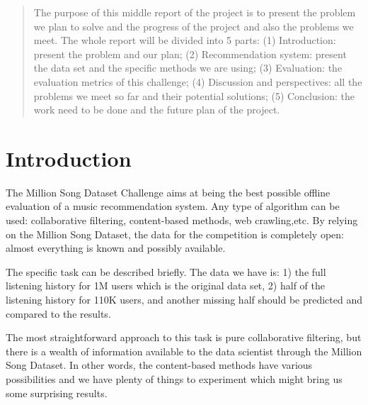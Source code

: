 \documentclass{article}
\begin{document}
 

\begin{abstract} 
The purpose of this middle report of the project is to present the problem we plan to solve and the progress of the project and also the problems we meet. The whole report will be divided into 5 parts: (1) Introduction: present the problem and our plan; (2) Recommendation system: present the data set and the specific methods we are using; (3) Evaluation: the evaluation metrics of this challenge; (4) Discussion and perspectives: all the problems we meet so far and their potential solutions; (5) Conclusion: the work need to be done and the future plan of the project.
\end{abstract} 


\section{Introduction}
The Million Song Dataset Challenge aims at being the best possible offline evaluation of a music recommendation system. Any type of algorithm can be used: collaborative filtering, content-based methods, web crawling,etc. By relying on the Million Song Dataset, the data for the competition is completely open: almost everything is known and possibly available.

The specific task can be described briefly. The data we have is: 1) the full listening history for 1M users which is the original data set, 2) half of the listening history for 110K users, and another missing half should be predicted and compared to the results. 

The most straightforward approach to this task is pure collaborative filtering, but there is a wealth of information available to the data scientist through the Million Song Dataset. In  other words, the content-based methods have various possibilities and we have plenty of things to experiment which might bring us some surprising results.
\end{document}
